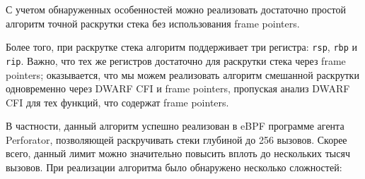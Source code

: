 С учетом обнаруженных особенностей можно реализовать достаточно простой алгоритм
точной раскрутки стека без использования frame pointers.

Более того, при раскрутке стека алгоритм поддерживает три регистра: \verb!rsp!, \verb!rbp! и \verb!rip!.
Важно, что тех же регистров достаточно для раскрутки стека через frame pointers; оказывается, что мы можем реализовать
алгоритм смешанной раскрутки одновременно через DWARF CFI и frame pointers, пропуская анализ DWARF CFI для тех функций, что содержат
frame pointers.

В частности, данный алгоритм успешно реализован в eBPF программе агента Perforator, позволяющей раскручивать стеки глубиной до 256 вызовов.
Скорее всего, данный лимит можно значительно повысить вплоть до нескольких тысяч вызовов.
При реализации алгоритма было обнаружено несколько сложностей:
